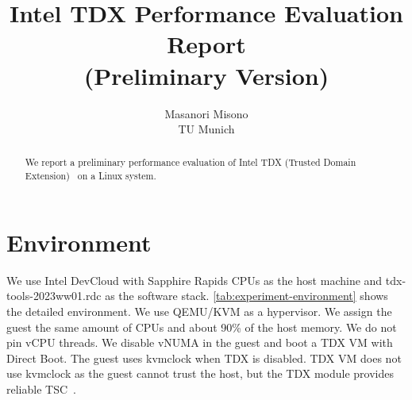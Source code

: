 \documentclass[letterpaper,twocolumn,10pt]{article}
\newcommand{\titlename}{
Intel TDX Performance Evaluation Report \\ (Preliminary Version)
}
\begin{document}

\date{}

\title{\Large \bf \titlename}

\author{
{\rm Masanori Misono}\\
TU Munich
} %

\maketitle

\begin{abstract}
We report a preliminary performance evaluation of Intel TDX (Trusted Domain Extension)~\cite{tdx} on a Linux system.
\end{abstract}

\section{Environment}

We use Intel DevCloud with Sapphire Rapids CPUs as the host machine and tdx-tools-2023ww01.rdc as the software stack.
\autoref{tab:experiment-environment} shows the detailed environment.
We use QEMU/KVM as a hypervisor.
We assign the guest the same amount of CPUs and about 90\% of the host memory.
We do not pin vCPU threads.
We disable vNUMA in the guest and boot a TDX VM with Direct Boot.
The guest uses kvmclock when TDX is disabled.
TDX VM does not use kvmclock as the guest cannot trust the host, but the TDX module provides reliable TSC~\cite{tdx_secure_spec}.
\end{document}
